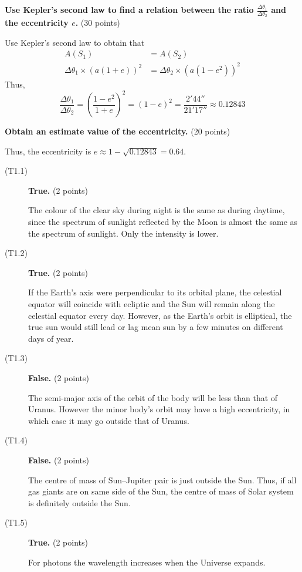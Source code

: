 \medskip
\textbf{Use Kepler's second law to find a relation between the ratio
$\frac{\Delta\theta_1}{\Delta\theta_2}$ and the eccentricity $e$.}
\hfill(30 points)

Use Kepler's second law to obtain that
\begin{align*}
  A(S_1) &= A(S_2) \\
  \Delta\theta_1\times(a(1 + e))^2 &= \Delta\theta_2\times(a(1 - e^2))^2
\end{align*}
Thus,
\[
  \frac{\Delta\theta_1}{\Delta\theta_2}
    = \left(\frac{1 - e^2}{1 + e}\right)^2 = (1 - e)^2
    = \frac{2'44''}{21'17''} \approx 0.12843
\]

\medskip
\textbf{Obtain an estimate value of the eccentricity.} \hfill(20 points)

Thus, the eccentricity is $e \approx 1 - \sqrt{0.12843} = 0.64$.

\begin{description}
\item[(T1.1)] \textbf{True.} \hfill(2 points)

  The colour of the clear sky during night is the same as during daytime,
  since the spectrum of sunlight reflected by the Moon is almost the same as
  the spectrum of sunlight. Only the intensity is lower.

\item[(T1.2)] \textbf{True.} \hfill(2 points)

  If the Earth's axis were perpendicular to its orbital plane, the celestial
  equator will coincide with ecliptic and the Sun will remain along the
  celestial equator every day. However, as the Earth's orbit is elliptical,
  the true sun would still lead or lag mean sun by a few minutes on different
  days of year.

\item[(T1.3)] \textbf{False.} \hfill(2 points)

  The semi-major axis of the orbit of the body will be less than that of
  Uranus. However the minor body's orbit may have a high eccentricity, in
  which case it may go outside that of Uranus.

\item[(T1.4)] \textbf{False.} \hfill(2 points)

  The centre of mass of Sun--Jupiter pair is just outside the Sun. Thus, if
  all gas giants are on same side of the Sun, the centre of mass of Solar
  system is definitely outside the Sun.

\item[(T1.5)] \textbf{True.} \hfill(2 points)

  For photons the wavelength increases when the Universe expands.
\end{description}

